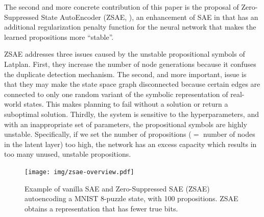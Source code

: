 The second and more concrete contribution of this paper is
the proposal of Zero-Suppressed State AutoEncoder (ZSAE, ), an enhancement of SAE in \latentplanner
that has an additional regularization penalty function for the neural network 
that makes the learned propositions more ``stable''.

ZSAE addresses three issues caused by the unstable propositional symbols of Latplan.
First, they increase the number of node generations because it confuses the duplicate detection mechanism.
The second, and more important, issue is that they may make the state space graph disconnected because certain edges
are connected to only one random variant of the symbolic representation of real-world states.
This makes planning to fail without a solution or return a suboptimal solution.
Thirdly, the system is sensitive to the hyperparameters, and with an inappropriate set of parameters,
the propositional symbols are highly unstable.
Specifically, if we set the number of propositions ($=$ number of nodes in the latent layer) too high, the network
has an excess capacity which results in too many unused, unstable propositions.

\begin{figure}[htb]
 \centering
 \texttt{[image: img/zsae-overview.pdf]}
 \caption{
Example of vanilla SAE and Zero-Suppressed SAE (ZSAE) autoencoding a MNIST 8-puzzle state, with 100 propositions.
ZSAE obtains a representation that has fewer true bits.}
 \label{zsae-overview}
\end{figure}


% 

